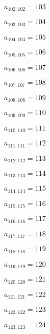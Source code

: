 \documentclass[a4paper,12pt]{article}
\begin{document}
$a _{ 102, 102 } = 103$

$a _{ 103, 103 } = 104$

$a _{ 104, 104 } = 105$

$a _{ 105, 105 } = 106$

$a _{ 106, 106 } = 107$

$a _{ 107, 107 } = 108$

$a _{ 108, 108 } = 109$

$a _{ 109, 109 } = 110$

$a _{ 110, 110 } = 111$

$a _{ 111, 111 } = 112$

$a _{ 112, 112 } = 113$

$a _{ 113, 113 } = 114$

$a _{ 114, 114 } = 115$

$a _{ 115, 115 } = 116$

$a _{ 116, 116 } = 117$

$a _{ 117, 117 } = 118$

$a _{ 118, 118 } = 119$

$a _{ 119, 119 } = 120$

$a _{ 120, 120 } = 121$

$a _{ 121, 121 } = 122$

$a _{ 122, 122 } = 123$

$a _{ 123, 123 } = 124$
\end{document}
